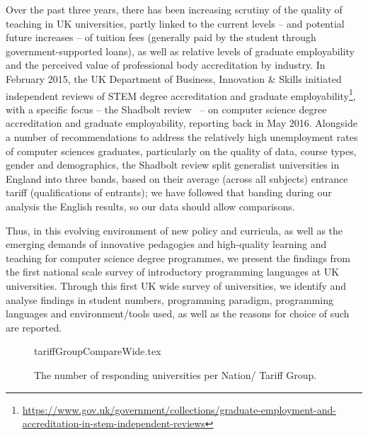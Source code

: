 \documentclass[a4paper,11pt]{article}
\begin{document}
Over the past three years, there has been increasing scrutiny of the
quality of teaching in UK universities, partly linked to the current
levels -- and potential future increases -- of tuition fees (generally
paid by the student through government-supported loans), as well as
relative levels of graduate employability and the perceived value of
professional body accreditation by industry. In February 2015, the UK
Department of Business, Innovation \& Skills initiated independent
reviews of STEM degree accreditation and graduate
employability\footnote{\url{https://www.gov.uk/government/collections/graduate-employment-and-accreditation-in-stem-independent-reviews}},
with a specific focus -- the Shadbolt review~\cite{shadbolt:2016} --
on computer science degree accreditation and graduate employability,
reporting back in May 2016. Alongside a number of recommendations to
address the relatively high unemployment rates of computer sciences
graduates, particularly on the quality of data, course types, gender and
demographics, the Shadbolt review split generalist universities in
England into three bands, based on their average (across all subjects)
entrance tariff (qualifications of entrants); we have followed that
banding during our analysis the English results, so our data should
allow comparisons.

Thus, in this evolving environment of new policy and curricula, as
well as the emerging demands of innovative pedagogies and high-quality
learning and teaching for computer science degree programmes, we
present the findings from the first national scale survey of
introductory programming languages at UK universities. Through this
first UK wide survey of universities, we identify and analyse findings
in student numbers, programming paradigm, programming languages and
environment/tools used, as well as the reasons for choice of such are
reported.


\begin{figure}
\begin{center}
{tariffGroupCompareWide.tex}
\caption{The number of responding universities per Nation/   
 Tariff Group.\label{fig:TG}}
\end{center}
\end{figure}
\end{document}
